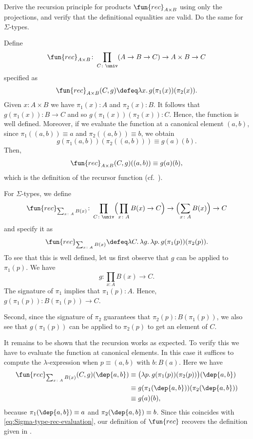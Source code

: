 \begin{exr}
    Derive the recursion principle for products\/ $\fun{rec}_{A\times B}$ using only the projections, and verify that the definitional equalities are valid. Do the same for\/ $\Sigma$-types.
\end{exr}

\begin{solution}
    Define
    \[
        \fun{rec}_{A\times B}\colon
            \prod_{C\colon\univ}(A\to B\to C)
            \to
            A\times B\to C
    \]
    specified as
    \[
        \fun{rec}_{A\times B}(C,g)
            \defeq\lambda x.\,g(\pi_1(x))(\pi_2(x)).
    \]
    Given $x\colon A\times B$ we have $\pi_1(x)\colon A$ and $\pi_2(x)\colon B$. It follows that $g(\pi_1(x))\colon B\to C$ and so $g(\pi_1(x))(\pi_2(x))\colon C$. Hence, the function is well defined. Moreover, if we evaluate the function at a canonical element $(a,b)$, since $\pi_1((a,b))\equiv a$ and $\pi_2((a,b))\equiv b$, we obtain
    \[
        g(\pi_1(a,b))(\pi_2((a,b)))\equiv g(a)(b).
    \]
    Then,
    \[
        \fun{rec}_{A\times B}(C,g)((a,b))
            \equiv g(a)(b),
    \]
    which is the definition of the recursor function (cf.~).

    For $\Sigma$-types, we define
    \[
        \fun{rec}_{\sum_{x\colon A} B(x)}\colon
            \prod_{C\colon\univ}\Bigl(\prod_{x\colon A}B(x)
                \to C\Bigr)
                \to \Bigl(\sum_{x\colon A}B(x)\Bigr)
                \to C
    \]
    and specify it as
    \[
        \fun{rec}_{\sum_{x\colon A}B(x)}
            \defeq\lambda C.\,\lambda g.\,
                \lambda p.\,g(\pi_1(p))(\pi_2(p)).
    \]
    To see that this is well defined, let us first observe that $g$ can be applied to $\pi_1(p)$. We have
    \[
        g\colon\prod_{x\colon A}B(x)\to C.
    \]
    The signature of $\pi_1$ implies that $\pi_1(p)\colon A$. Hence, $g(\pi_1(p))\colon B(\pi_1(p))\to C$.

    Second, since the signature of $\pi_2$ guarantees that $\pi_2(p)\colon B(\pi_1(p))$, we also see that $g(\pi_1(p))$ can be applied to $\pi_2(p)$ to get an element of $C$.

    It remains to be shown that the recursion works as expected. To verify this we have to evaluate the function at canonical elements. In this case it suffices to compute the $\lambda$-expression when $p\equiv(a,b)$ with $b\colon B(a)$. Here we have
    \begin{align*}
        \fun{rec}_{\sum_{x\colon A}B(x)}(C,g)(\dep{a,b})
            &\equiv
                \bigl(
                    \lambda p.\,g(\pi_1(p))(\pi_2(p))
                \bigr)(\dep{a,b})\\
            &\equiv g(\pi_1(\dep{a,b}))(\pi_2(\dep{a,b}))\\
            &\equiv g(a)(b),
    \end{align*}
    because $\pi_1(\dep{a,b})\equiv a$ and $\pi_2(\dep{a,b})\equiv b$. Since this coincides with \eqref{eq:Sigma-type-rec-evaluation}, our definition of $\fun{rec}$ recovers the definition given in .

\end{solution}

